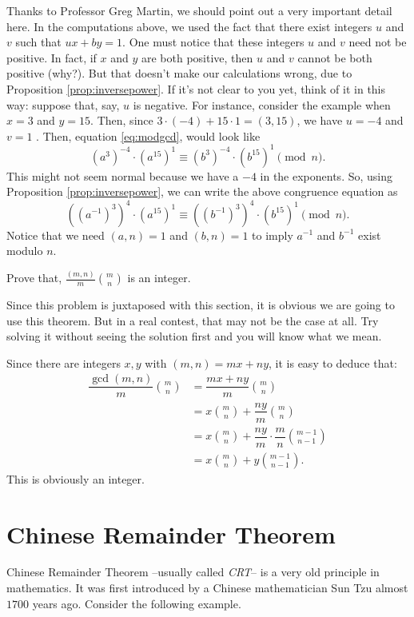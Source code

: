\documentclass{subfile}
\begin{document}
\begin{remark}
		Thanks to Professor Greg Martin, we should point out a very important detail here. In the computations above, we used the fact that there exist integers $u$ and $v$ such that $ux+by = 1$. One must notice that these integers $u$ and $v$ need not be positive. In fact, if $x$ and $y$ are both positive, then $u$ and $v$ cannot be both positive (why?). But that doesn't make our calculations wrong, due to Proposition \ref{prop:inversepower}. If it's not clear to you yet, think of it in this way: suppose that, say, $u$ is negative. For instance, consider the example when $x=3$ and $y=15$. Then, since $3 \cdot (-4) + 15 \cdot 1 = (3,15)$, we have $u=-4$ and $v=1$ . Then, equation \eqref{eq:modgcd}, would look like $$(a^3)^{-4} \cdot (a^{15})^{1} \equiv (b^3)^{-4} \cdot (b^{15})^{1} \pmod n.$$
		This might not seem normal because we have a $-4$ in the exponents. So, using Proposition \ref{prop:inversepower}, we can write the above congruence equation as
		$$\left(\left(a^{-1}\right)^3\right)^{4} \cdot (a^{15})^{1} \equiv \left(\left(b^{-1}\right)^3\right)^{4} \cdot (b^{15})^{1} \pmod n.$$
		Notice that we need $(a,n)=1$ and $(b,n)=1$ to imply $a^{-1}$ and $b^{-1}$ exist modulo $n$.
\end{remark}

	\begin{problem}
		Prove that, $\frac{(m,n)}{m}\binom{m}{n}$ is an integer.
	\end{problem}
	Since this problem is juxtaposed with this section, it is obvious we are going to use this theorem. But in a real contest, that may  not be the case at all. Try solving it without seeing the solution first and you will know what we mean.
	\begin{solution}
		Since there are integers $x,y$ with $(m,n)=mx+ny$, it is easy to deduce that:
			\begin{align*}
				\dfrac{\gcd(m,n)}{m}\binom{m}{n}
					& = \dfrac{mx+ny}{m}\binom{m}{n}\\
					& = x\binom{m}{n}+\dfrac{ny}{m}\binom{m}{n}\\
					& = x\binom{m}{n}+\dfrac{ny}{m}\cdot\dfrac{m}{n}\binom{m-1}{n-1}\\
					& = x\binom{m}{n}+y\binom{m-1}{n-1}.
			\end{align*}
		This is obviously an integer.
	\end{solution}

\section{Chinese Remainder Theorem}
	Chinese Remainder Theorem --usually called \textit{CRT}-- is a very old principle in mathematics. It was first introduced by a Chinese mathematician Sun Tzu almost $1700$ years ago. Consider the following example.
\end{document}
